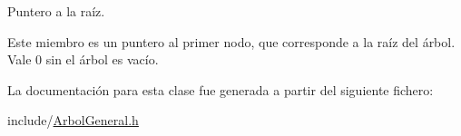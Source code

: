 Puntero a la raíz. 

Este miembro es un puntero al primer nodo, que corresponde a la raíz del árbol. Vale 0 sin el árbol es vacío. 

La documentación para esta clase fue generada a partir del siguiente fichero\+:\begin{DoxyCompactItemize}
\item 
include/\hyperlink{ArbolGeneral_8h}{Arbol\+General.\+h}\end{DoxyCompactItemize}
